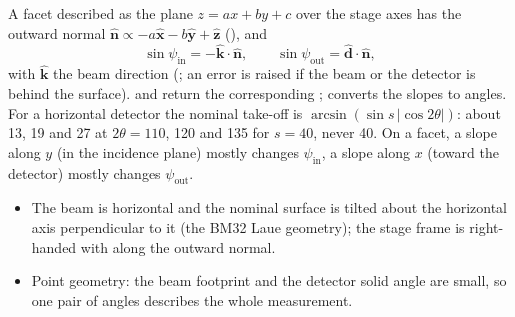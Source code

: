 A facet described as the plane $z = ax + by + c$ over the stage axes has the outward normal
$\hat{\mathbf n} \propto -a\hat{\mathbf x} - b\hat{\mathbf y} + \hat{\mathbf z}$
(), and
\begin{equation}
  \sin\psi_\mathrm{in} = -\hat{\mathbf k}\cdot\hat{\mathbf n}, \qquad
  \sin\psi_\mathrm{out} = \hat{\mathbf d}\cdot\hat{\mathbf n},
\end{equation}
with $\hat{\mathbf k}$ the beam direction (; an error is raised if the beam or the
detector is behind the surface).  and  return the corresponding
;  converts the slopes to angles. For a horizontal detector the nominal
take-off is $\arcsin(\sin s\,|\cos 2\theta|)$: about 13, 19 and 27\textdegree{} at $2\theta =
110$, 120 and 135\textdegree{} for $s = 40$\textdegree, never 40\textdegree. On a facet, a slope
along $y$ (in the incidence plane) mostly changes $\psi_\mathrm{in}$, a slope along $x$ (toward
the detector) mostly changes $\psi_\mathrm{out}$.
\begin{hyp}
\begin{itemize}[nosep,leftmargin=1em]
\item The beam is horizontal and the nominal surface is tilted about the horizontal axis
  perpendicular to it (the BM32 Laue geometry); the stage frame is right-handed with
   along the outward normal.
\item Point geometry: the beam footprint and the detector solid angle are small, so one pair of
  angles describes the whole measurement.
\end{itemize}
\end{hyp}

